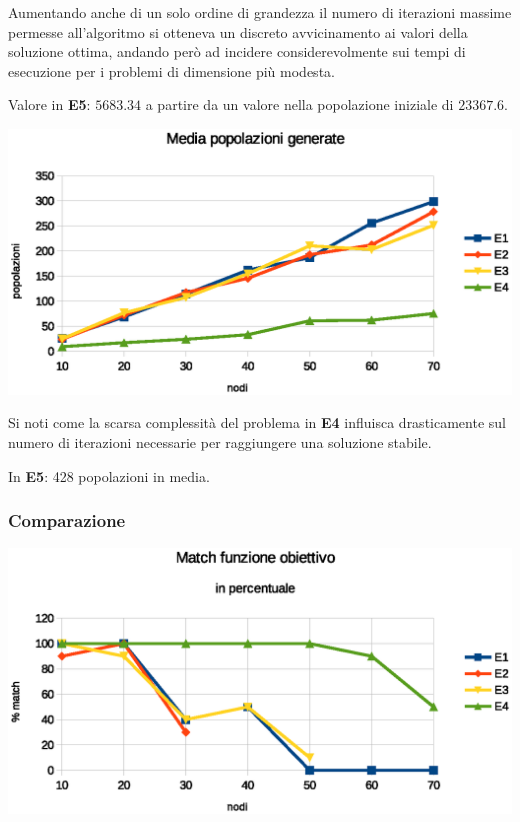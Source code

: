 \documentclass[a4paper]{article}
\begin{document}
                    Aumentando anche di un solo ordine di grandezza il numero di iterazioni massime permesse all'algoritmo si otteneva un discreto
                    avvicinamento ai valori della soluzione ottima, andando per\`o ad incidere considerevolmente sui tempi di esecuzione per i problemi
                    di dimensione pi\`u modesta.

                    Valore in \textbf{E5}: $5683.34$ a partire da un valore nella popolazione iniziale di $23367.6$.

                    \includegraphics[scale=0.7]{img/popavg}

                    Si noti come la scarsa complessit\`a del problema in \textbf{E4} influisca drasticamente sul numero di iterazioni necessarie per raggiungere
                    una soluzione stabile.

                    In \textbf{E5}: 428 popolazioni in media.

                \subsubsection{Comparazione}

                    \includegraphics[scale=0.7]{img/match}
\end{document}
